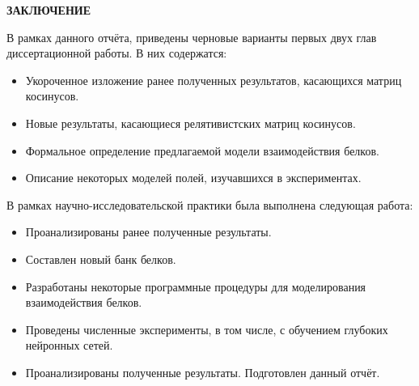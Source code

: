 \newpage
\begin{center}
	\textbf{\large ЗАКЛЮЧЕНИЕ}
\end{center}

В рамках данного отчёта, приведены черновые варианты первых двух глав диссертационной работы. В них содержатся:
\begin{itemize}
\item Укороченное изложение ранее полученных результатов, касающихся матриц косинусов.
\item Новые результаты, касающиеся релятивистских матриц косинусов.
\item Формальное определение предлагаемой модели взаимодействия белков.
\item Описание некоторых моделей полей, изучавшихся в экспериментах. 
\end{itemize}

В рамках научно-исследовательской практики была выполнена следующая работа:
\begin{itemize}
\item Проанализированы ранее полученные результаты.
\item Составлен новый банк белков.
\item Разработаны некоторые программные процедуры для моделирования взаимодействия белков.
\item Проведены численные эксперименты, в том числе, с обучением глубоких нейронных сетей.
\item Проанализированы полученные результаты. Подготовлен данный отчёт.
\end{itemize}